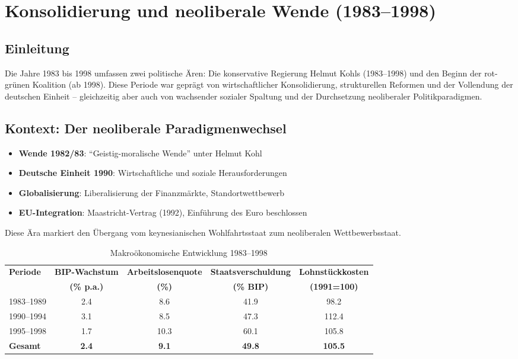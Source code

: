 \chapter{Konsolidierung und neoliberale Wende (1983–1998)}
\label{chap:konsolidierung}

\section*{Einleitung}
Die Jahre 1983 bis 1998 umfassen zwei politische Ären: Die konservative Regierung Helmut Kohls (1983–1998) und den Beginn der rot-grünen Koalition
(ab 1998). Diese Periode war geprägt von wirtschaftlicher Konsolidierung, strukturellen Reformen und der Vollendung der deutschen
Einheit – gleichzeitig aber auch von wachsender sozialer Spaltung und der Durchsetzung neoliberaler Politikparadigmen.

\section{Kontext: Der neoliberale Paradigmenwechsel}

\begin{itemize}
    \item \textbf{Wende 1982/83}: \enquote{Geistig-moralische Wende} unter Helmut Kohl
    \item \textbf{Deutsche Einheit 1990}: Wirtschaftliche und soziale Herausforderungen
    \item \textbf{Globalisierung}: Liberalisierung der Finanzmärkte, Standortwettbewerb
    \item \textbf{EU-Integration}: Maastricht-Vertrag (1992), Einführung des Euro beschlossen
\end{itemize}

Diese Ära markiert den Übergang vom keynesianischen Wohlfahrtsstaat zum neoliberalen Wettbewerbsstaat.

\begin{table}[ht]
    \centering
    \caption{Makroökonomische Entwicklung 1983–1998}
    \label{tab:makro_konsolidierung}
    \begin{tabular}{lcccc}
        \toprule
        \textbf{Periode} & \textbf{BIP-Wachstum} & \textbf{Arbeitslosenquote} & \textbf{Staatsverschuldung} & \textbf{Lohnstückkosten} \\
        & \textbf{(\% p.a.)} & \textbf{(\%)} & \textbf{(\% BIP)} & \textbf{(1991=100)} \\
        \midrule
        1983–1989 & 2.4 & 8.6 & 41.9 & 98.2 \\
        1990–1994 & 3.1 & 8.5 & 47.3 & 112.4 \\
        1995–1998 & 1.7 & 10.3 & 60.1 & 105.8 \\
        \midrule
        \textbf{Gesamt} & \textbf{2.4} & \textbf{9.1} & \textbf{49.8} & \textbf{105.5} \\
        \bottomrule
    \end{tabular}
\end{table}

